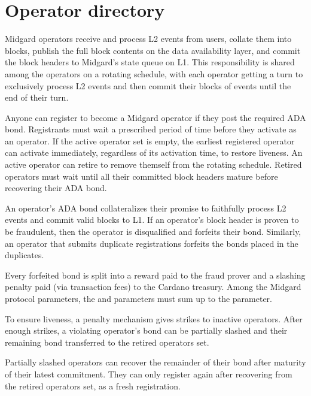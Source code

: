 \documentclass[../midgard.tex]{subfiles}
\begin{document}

\section{Operator directory}
\label{h:operator-directory}

Midgard operators receive and process L2 events from users, collate them into blocks, publish the full block contents on the data availability layer, and commit the block headers to Midgard's state queue on L1.
This responsibility is shared among the operators on a rotating schedule, with each operator getting a turn to exclusively process L2 events and then commit their blocks of events until the end of their turn.

Anyone can register to become a Midgard operator if they post the required ADA bond.
Registrants must wait a prescribed period of time before they activate as an operator.
If the active operator set is empty, the earliest registered operator can activate immediately, regardless of its activation time, to restore liveness.
An active operator can retire to remove themself from the rotating schedule.
Retired operators must wait until all their committed block headers mature before recovering their ADA bond.

An operator's ADA bond collateralizes their promise to faithfully process L2 events and commit valid blocks to L1.
If an operator's block header is proven to be fraudulent, then the operator is disqualified and forfeits their bond.
Similarly, an operator that submits duplicate registrations forfeits the bonds placed in the duplicates.

Every forfeited bond is split into a reward paid to the fraud prover and a slashing penalty paid (via transaction fees) to the Cardano treasury.
Among the Midgard protocol parameters, the  and  parameters must sum up to the  parameter.

To ensure liveness, a penalty mechanism gives strikes to inactive operators.
After enough strikes, a violating operator's bond can be partially slashed and their remaining bond transferred to the retired operators set.

Partially slashed operators can recover the remainder of their bond after maturity of their latest commitment.
They can only register again after recovering from the retired operators set, as a fresh registration.
\end{document}
